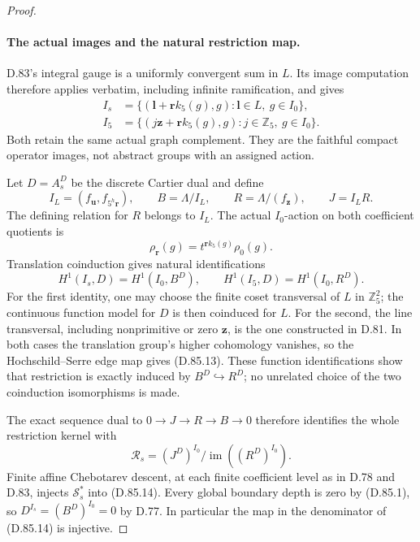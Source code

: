 \begin{proof}
\paragraph{The actual images and the natural restriction map.}
D.83's integral gauge is a uniformly convergent sum in
\(L\). Its image computation therefore applies verbatim,
including infinite ramification, and gives
\[
 \begin{split}
 I_s&=\{(\mathbf l+\mathbf r k_5(g),g):
                               \mathbf l\in L,\ g\in I_0\},\\
 I_5&=\{(j\mathbf z+\mathbf r k_5(g),g):
                               j\in\mathbb Z_5,\ g\in I_0\}.
 \end{split}                                                   \tag{D.85.10}
\]
Both retain the same actual graph complement. They are
the faithful compact operator images, not abstract groups
with an assigned action.

Let \(D=A_s^D\) be the discrete Cartier dual and define
\[
 I_L=(f_{\mathbf u},f_{5^h\mathbf r}),\qquad
 B=\Lambda/I_L,\qquad R=\Lambda/(f_{\mathbf z}),\qquad
 J=I_LR.
                                                               \tag{D.85.11}
\]
The defining relation for \(R\) belongs to \(I_L\).
The actual \(I_0\)-action on both coefficient quotients is
\[
             \rho_{\mathbf r}(g)=t^{\mathbf r k_5(g)}\rho_0(g).
                                                               \tag{D.85.12}
\]
Translation coinduction gives natural identifications
\[
 H^1(I_s,D)=H^1(I_0,B^D),\qquad
 H^1(I_5,D)=H^1(I_0,R^D).
                                                               \tag{D.85.13}
\]
For the first identity, one may choose the finite coset
transversal of \(L\) in \(\mathbb Z_5^2\); the continuous
function model for \(D\) is then coinduced for \(L\).
For the second, the line transversal, including nonprimitive
or zero \(\mathbf z\), is the one constructed in D.81.
In both cases the translation group's higher cohomology
vanishes, so the Hochschild--Serre edge map gives (D.85.13).
These function identifications show that restriction is
exactly induced by \(B^D\hookrightarrow R^D\); no unrelated
choice of the two coinduction isomorphisms is made.

The exact sequence dual to \(0\to J\to R\to B\to0\)
therefore identifies the whole restriction kernel with
\[
 \mathcal R_s=(J^D)^{I_0}/\operatorname{im}((R^D)^{I_0}).
                                                               \tag{D.85.14}
\]
Finite affine Chebotarev descent, at each finite coefficient
level as in D.78 and D.83, injects
\(\mathcal S_s^*\) into (D.85.14).
Every global boundary depth is zero by (D.85.1), so
\(D^{I_s}=(B^D)^{I_0}=0\) by D.77. In particular the
map in the denominator of (D.85.14) is injective.


\end{proof}
